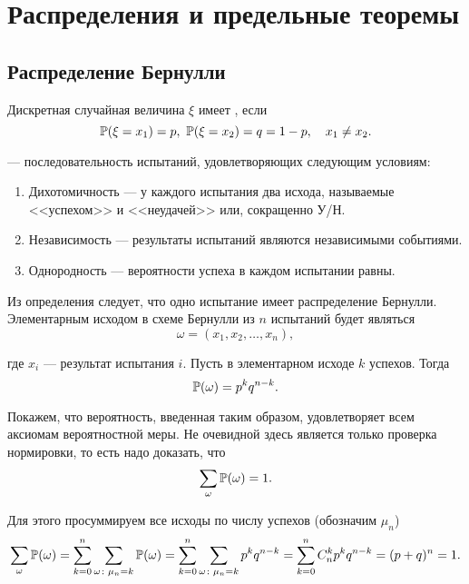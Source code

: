 \documentclass[../TV&MS.tex]{subfiles}
\begin{document}
    
\section{Распределения и предельные теоремы}

\subsection{Распределение Бернулли}

\begin{Def}
	Дискретная случайная величина $\xi$ имеет , если
$$ 
	\mathbb{P}(\xi = x_1) = p,\ \mathbb{P}(\xi = x_2) = q = 1 - p, \quad x_1 \not= x_2.
$$
\end{Def}

\begin{Def}
	 --- последовательность испытаний, 
	удовлетворяющих следующим условиям:
\begin{enumerate}
	\item Дихотомичность --- у каждого испытания два исхода, 
	называемые <<успехом>> и <<неудачей>> или, сокращенно У/Н.
	
	\item Независимость --- результаты испытаний являются независимыми событиями.

	\item Однородность --- вероятности успеха в каждом испытании равны.
\end{enumerate}
\end{Def}

	Из определения следует, что одно испытание имеет распределение Бернулли. 
	Элементарным исходом в схеме Бернулли из $n$ испытаний будет являться
	$$\omega = (x_1, x_2, \ldots, x_n),$$
	
	\noindent где $x_i$ --- результат испытания $i$. Пусть в элементарном исходе 
	$k$ успехов. Тогда
	$$\mathbb{P}(\omega) = p^kq^{n-k}.$$

	Покажем, что вероятность, введенная таким образом, удовлетворяет всем аксиомам 
	вероятностной меры. Не очевидной здесь является только проверка нормировки, 
	то есть надо доказать, что
	$$\sum\limits_{\omega}\mathbb{P}(\omega) = 1.$$

	Для этого просуммируем все исходы по числу успехов (обозначим $\mu_n$)
	$$\sum\limits_{\omega}\mathbb{P}(\omega) = \sum\limits_{k = 0}^n
	\sum\limits_{\omega\colon\mu_n=k}\mathbb{P}(\omega) = \sum\limits_{k = 0}^n
	\sum\limits_{\omega\colon\mu_n=k}p^kq^{n-k} = 
	\sum\limits_{k = 0}^nC_n^kp^kq^{n-k} = (p+q)^n = 1.$$
\end{document}
